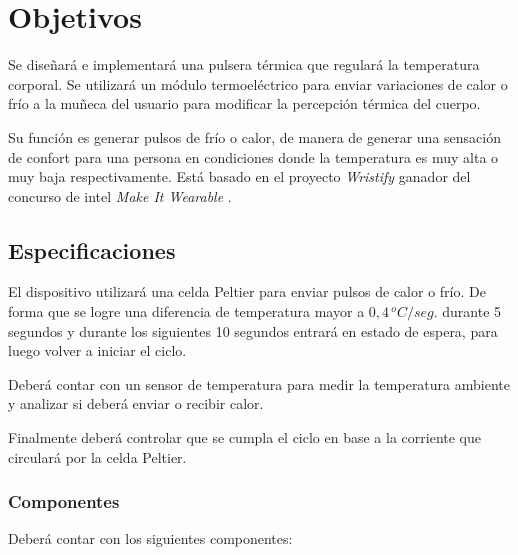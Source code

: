 \documentclass[10pt,spanish,a4paper,openany,notitlepage]{article}
\begin{document}
\tableofcontents
\newpage

\section{Objetivos}
Se diseñará e implementará una pulsera térmica que regulará la
temperatura corporal. Se utilizará un módulo termoeléctrico para enviar
variaciones de calor o frío a la muñeca del usuario para modificar
la percepción térmica del cuerpo.

Su función es generar pulsos de frío o calor, de manera de generar una sensación de 
confort para una persona en condiciones donde la temperatura es muy alta 
o muy baja respectivamente.
Está basado en el proyecto \emph{Wristify} \cite{embrlabs} ganador del concurso de intel 
\emph{Make It Wearable} \cite{Make It Wearable}.


\subsection{Especificaciones}

El dispositivo utilizará una celda Peltier para enviar pulsos de calor
o frío. De forma que se logre una diferencia de temperatura mayor a $0,4\, \unit{^oC/seg.}$
durante 5 segundos y durante los siguientes 10 segundos entrará
en estado de espera, para luego volver a iniciar el ciclo. 

Deberá contar con un sensor de temperatura para medir la temperatura ambiente
y analizar si deberá enviar o recibir calor.

Finalmente deberá controlar que se cumpla el ciclo en base a la corriente
que circulará por la celda Peltier.

\subsubsection{Componentes}

Deberá contar con los siguientes componentes:
\end{document}

